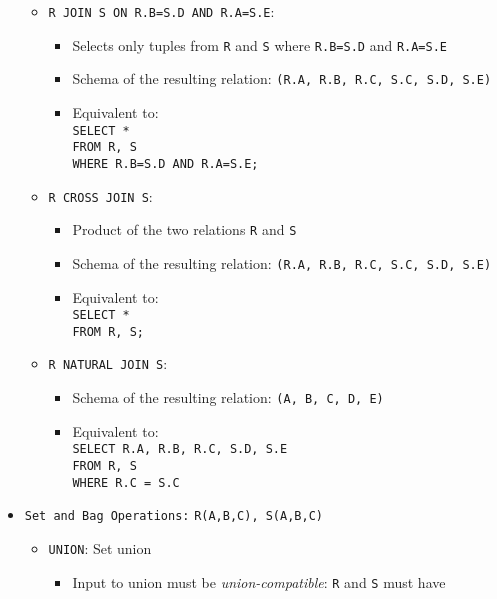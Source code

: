 \documentclass[landscape,8pt]{extarticle}
\newcommand{\code}{\lstinline}
\begin{document}
\begin{multicols}{4}
\begin{itemize}
    \begin{itemize}
        \item \code{R JOIN S ON R.B=S.D AND R.A=S.E}:
        \begin{itemize}
            \item Selects only tuples from \code{R} and \code{S} where \code{R.B=S.D} and \code{R.A=S.E}
            \item Schema of the resulting relation: \code{(R.A, R.B, R.C, S.C, S.D, S.E)}
            \item Equivalent to: \\
            \code{SELECT *} \\
            \code{FROM R, S} \\
            \code{WHERE R.B=S.D AND R.A=S.E;}
        \end{itemize}
        \item \code{R CROSS JOIN S}:
        \begin{itemize}
            \item Product of the two relations \code{R} and \code{S}
            \item Schema of the resulting relation: \code{(R.A, R.B, R.C, S.C, S.D, S.E)}
            \item Equivalent to: \\
            \code{SELECT *} \\
            \code{FROM R, S;}
        \end{itemize}
        \item \code{R NATURAL JOIN S}:
        \begin{itemize}
            \item Schema of the resulting relation: \code{(A, B, C, D, E)}
            \item Equivalent to: \\
            \code{SELECT R.A, R.B, R.C, S.D, S.E} \\
            \code{FROM R, S} \\
            \code{WHERE R.C = S.C}
        \end{itemize}
    \end{itemize}
    \item \code{Set and Bag Operations:} \code{R(A,B,C), S(A,B,C)}
    \begin{itemize}
        \item \code{UNION}: Set union
        \begin{itemize}
            \item Input to union must be \emph{union-compatible}: \code{R} and \code{S} must have

\end{itemize}
\end{itemize}
\end{itemize}
\end{multicols}
\end{document}
